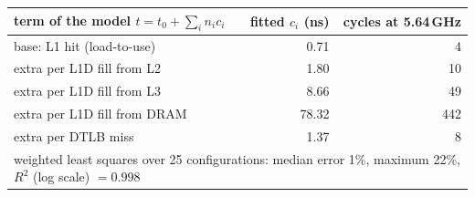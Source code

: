 \begin{tabular}{lrr}
\toprule
term of the model $t = t_0 + \sum_i n_i c_i$ & fitted $c_i$ (ns) & cycles at 5.64\,GHz \\
\midrule
base: L1 hit (load-to-use) & 0.71 & 4 \\
extra per L1D fill from L2 & 1.80 & 10 \\
extra per L1D fill from L3 & 8.66 & 49 \\
extra per L1D fill from DRAM & 78.32 & 442 \\
extra per DTLB miss & 1.37 & 8 \\
\bottomrule
\multicolumn{3}{l}{\footnotesize weighted least squares over 25 configurations: median error 1\%, maximum 22\%, $R^2$ (log scale) $=0.998$}\\
\end{tabular}
